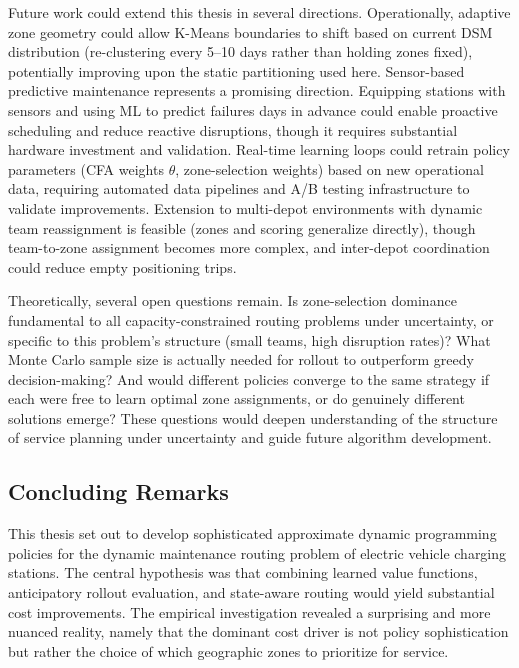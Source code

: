 \documentclass[12pt,oneside]{article}
\begin{document}
Future work could extend this thesis in several directions. Operationally, adaptive zone geometry could allow K-Means boundaries to shift based on current DSM distribution (re-clustering every 5--10 days rather than holding zones fixed), potentially improving upon the static partitioning used here. Sensor-based predictive maintenance represents a promising direction. Equipping stations with sensors and using ML to predict failures days in advance could enable proactive scheduling and reduce reactive disruptions, though it requires substantial hardware investment and validation. Real-time learning loops could retrain policy parameters (CFA weights $\theta$, zone-selection weights) based on new operational data, requiring automated data pipelines and A/B testing infrastructure to validate improvements. Extension to multi-depot environments with dynamic team reassignment is feasible (zones and scoring generalize directly), though team-to-zone assignment becomes more complex, and inter-depot coordination could reduce empty positioning trips.

Theoretically, several open questions remain. Is zone-selection dominance fundamental to all capacity-constrained routing problems under uncertainty, or specific to this problem's structure (small teams, high disruption rates)? What Monte Carlo sample size is actually needed for rollout to outperform greedy decision-making? And would different policies converge to the same strategy if each were free to learn optimal zone assignments, or do genuinely different solutions emerge? These questions would deepen understanding of the structure of service planning under uncertainty and guide future algorithm development.

\subsection{Concluding Remarks}\label{subsec_concluding_remarks}

This thesis set out to develop sophisticated approximate dynamic programming policies for the dynamic maintenance routing problem of electric vehicle charging stations. The central hypothesis was that combining learned value functions, anticipatory rollout evaluation, and state-aware routing would yield substantial cost improvements. The empirical investigation revealed a surprising and more nuanced reality, namely that the dominant cost driver is not policy sophistication but rather the choice of which geographic zones to prioritize for service.
\end{document}
